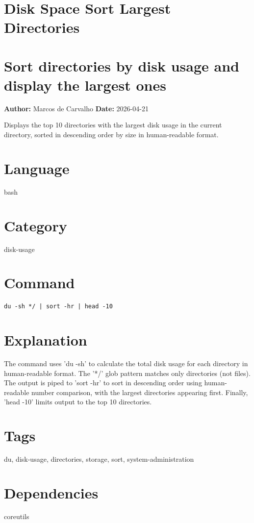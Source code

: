 \documentclass[openany]{book}
\begin{document}
\section{Disk Space Sort Largest Directories}
\section*{Sort directories by disk usage and display the largest ones}
\textbf{Author:} Marcos de Carvalho \hfill \textbf{Date:} 2026-04-21

\noindent Displays the top 10 directories with the largest disk usage in the current directory, sorted in descending order by size in human-readable format.

\section*{Language}
bash

\section*{Category}
disk-usage

\section*{Command}
\begin{lstlisting}
du -sh */ | sort -hr | head -10
\end{lstlisting}

\section*{Explanation}
The command uses 'du -sh' to calculate the total disk usage for each directory in human-readable format. The '*/' glob pattern matches only directories (not files). The output is piped to 'sort -hr' to sort in descending order using human-readable number comparison, with the largest directories appearing first. Finally, 'head -10' limits output to the top 10 directories.

\section*{Tags}
du, disk-usage, directories, storage, sort, system-administration

\section*{Dependencies}
coreutils
\end{document}
